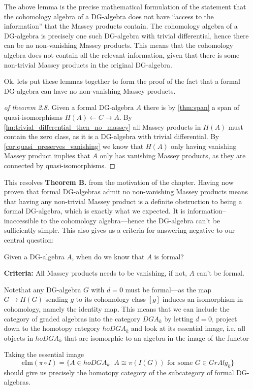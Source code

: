 The above lemma is the precise mathematical formulation of the statement that the cohomology algebra of a DG-algebra does not have ``access to the information'' that the Massey products contain. The cohomology algebra of a DG-algebra is precisely one such DG-algebra with trivial differential, hence there can be no non-vanishing Massey products. This means that the cohomology algebra does not contain all the relevant information, given that there is some non-trivial Massey products in the original DG-algebra. 

Ok, lets put these lemmas together to form the proof of the fact that a formal DG-algebra can have no non-vanishing Massey products. 

\begin{proof}[of theorem 2.8]
Given a formal DG-algebra $A$ there is by \cref{thm:span} a span of quasi-isomorphisms $H(A)\longleftarrow C\longrightarrow A$. By \cref{lm:trivial_differential_then_no_massey} all Massey products in $H(A)$ must contain the zero class, as it is a DG-algebra with trivial differential. By \cref{cor:quasi_preserves_vanishing} we know that $H(A)$ only having vanishing Massey product implies that $A$ only has vanishing Massey products, as they are connected by quasi-isomorphisms. 
\end{proof}

This resolves \textbf{Theorem B.} from the motivation of the chapter. Having now proven that formal DG-algebras admit no non-vanishing Massey products means that having any non-trivial Massey product is a definite obstruction to being a formal DG-algebra, which is exactly what we expected. It is information--inaccessible to the cohomology algebra---hence the DG-algebra can't be sufficiently simple. This also 	gives us a criteria for answering negative to our central question: 

\begin{central}
Given a DG-algebra $A$, when do we know that $A$ is formal?
\end{central}
\textbf{Criteria:} All Massey products needs to be vanishing, if not, $A$ can't be formal. 

Notethat any DG-algebra $G$ with $d=0$ must be formal---as the map $G\longrightarrow H(G)$ sending $g$ to its cohomology class $[g]$ induces an isomorphism in cohomology, namely the identity map. This means that we can include the category of graded algebras into the category $DGA_k$ by letting $d=0$, project down to the homotopy category $hoDGA_k$ and look at its essential image, i.e. all objects in $hoDGA_k$ that are isomorphic to an algebra in the image of the functor
\begin{center}
\end{center}
Taking the essential image
\begin{equation*}
    \text{eIm}(\pi\circ I) = \{A\in hoDGA_k \,\vert\, A\cong \pi( I(G)) \text{ for some } G\in GrAlg_k\}
\end{equation*}
should give us precisely the homotopy category of the subcategory of formal DG-algebras. 

